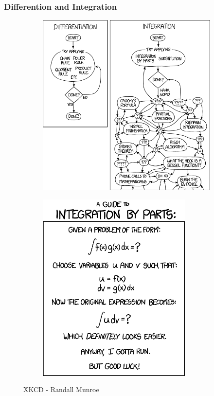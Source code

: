 \documentclass[notes]{beamer}
\begin{document}
\begin{frame}
\frametitle{Differention and Integration}
\begin{figure}[ht]
	\centering
	\begin{subfigure}[b]{0.49\linewidth}
		\centering
		\includegraphics[width=\textwidth]{figs/differentiation-integration.png}
	\end{subfigure}	
	\begin{subfigure}[b]{0.49\linewidth}
		\centering
		\includegraphics[width=0.85\textwidth]{figs/integration-parts.png}
	\end{subfigure}%
	\caption*{XKCD - Randall Munroe}
\end{figure}
\end{frame}
\end{document}
